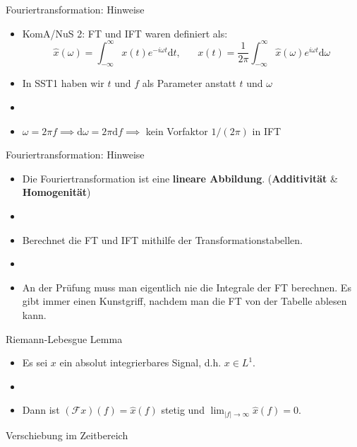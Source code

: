 \documentclass[14pt, aspectratio=169, handout]{beamer}
\begin{document}
\begin{frame}{Fouriertransformation: Hinweise}
    \begin{itemize}
        \item KomA/NuS 2: FT und IFT waren definiert als:
$$\hat{x}(\omega) = \int_{-\infty}^{\infty} x(t) e^{-i\omega t}\text{d}t, \hspace{20pt} x(t)=\frac{1}{2\pi} \int_{-\infty}^{\infty} \hat{x}(\omega)e^{i\omega t} \text{d}\omega$$
    \item In SST1 haben wir $t$ und $f$ als Parameter  anstatt $t$ und $\omega$
    \item[] 
    \item $\omega = 2\pi f \implies \text{d}\omega = 2\pi \text{d}f \implies$ kein Vorfaktor $1/(2\pi)$ in IFT
    \end{itemize}
\end{frame}

\begin{frame}{Fouriertransformation: Hinweise}
    \begin{itemize}
        \item Die Fouriertransformation ist eine \textbf{lineare Abbildung}. (\textbf{Additivität} \& \textbf{Homogenität})
        \item[] 
        \item \alert{Berechnet die FT und IFT mithilfe der Transformationstabellen.}
        \item[] 
        \item An der Prüfung muss man eigentlich nie die Integrale der FT berechnen. Es gibt immer einen Kunstgriff, nachdem man die FT von der Tabelle ablesen kann.
    \end{itemize}
\end{frame}

\begin{frame}{Riemann-Lebesgue Lemma}
    \begin{itemize}
        \item Es sei $x$ ein absolut integrierbares Signal, d.h. $x \in L^1$.
        \item[] 
        \item[]  Dann ist $(\mathcal{F}x)(f) = \hat{x}(f)$ stetig und $\displaystyle\lim_{|f| \to \infty} \hat{x}(f) = 0$.
    \end{itemize}
\end{frame}

\begin{frame}{Verschiebung im Zeitbereich}
    
\end{frame}
\end{document}
